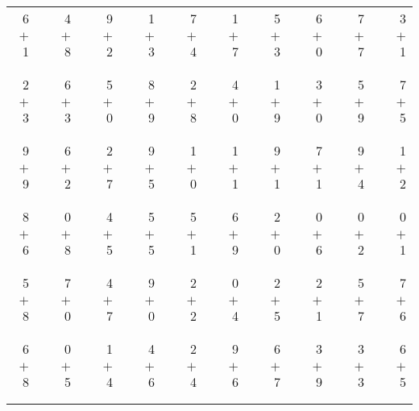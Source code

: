 \documentclass[12pt, letterpaper]{article}
\begin{document}
\begin{tabular}{rrrrrrrrrrrrrrrrrrr}
6 & & 4 & & 9 & & 1 & & 7 & & 1 & & 5 & & 6 & & 7 & & 3\\
$+$ 1 & & $+$ 8 & & $+$ 2 & & $+$ 3 & & $+$ 4 & & $+$ 7 & & $+$ 3 & & $+$ 0 & & $+$ 7 & & $+$ 1\\
\cline{1-1} \cline{3-3} \cline{5-5} \cline{7-7} \cline{9-9} \cline{11-11} \cline{13-13} \cline{15-15} \cline{17-17} \cline{19-19} \\ \\
2 & & 6 & & 5 & & 8 & & 2 & & 4 & & 1 & & 3 & & 5 & & 7\\
$+$ 3 & & $+$ 3 & & $+$ 0 & & $+$ 9 & & $+$ 8 & & $+$ 0 & & $+$ 9 & & $+$ 0 & & $+$ 9 & & $+$ 5\\
\cline{1-1} \cline{3-3} \cline{5-5} \cline{7-7} \cline{9-9} \cline{11-11} \cline{13-13} \cline{15-15} \cline{17-17} \cline{19-19} \\ \\
9 & & 6 & & 2 & & 9 & & 1 & & 1 & & 9 & & 7 & & 9 & & 1\\
$+$ 9 & & $+$ 2 & & $+$ 7 & & $+$ 5 & & $+$ 0 & & $+$ 1 & & $+$ 1 & & $+$ 1 & & $+$ 4 & & $+$ 2\\
\cline{1-1} \cline{3-3} \cline{5-5} \cline{7-7} \cline{9-9} \cline{11-11} \cline{13-13} \cline{15-15} \cline{17-17} \cline{19-19} \\ \\
8 & & 0 & & 4 & & 5 & & 5 & & 6 & & 2 & & 0 & & 0 & & 0\\
$+$ 6 & & $+$ 8 & & $+$ 5 & & $+$ 5 & & $+$ 1 & & $+$ 9 & & $+$ 0 & & $+$ 6 & & $+$ 2 & & $+$ 1\\
\cline{1-1} \cline{3-3} \cline{5-5} \cline{7-7} \cline{9-9} \cline{11-11} \cline{13-13} \cline{15-15} \cline{17-17} \cline{19-19} \\ \\
5 & & 7 & & 4 & & 9 & & 2 & & 0 & & 2 & & 2 & & 5 & & 7\\
$+$ 8 & & $+$ 0 & & $+$ 7 & & $+$ 0 & & $+$ 2 & & $+$ 4 & & $+$ 5 & & $+$ 1 & & $+$ 7 & & $+$ 6\\
\cline{1-1} \cline{3-3} \cline{5-5} \cline{7-7} \cline{9-9} \cline{11-11} \cline{13-13} \cline{15-15} \cline{17-17} \cline{19-19} \\ \\
6 & & 0 & & 1 & & 4 & & 2 & & 9 & & 6 & & 3 & & 3 & & 6\\
$+$ 8 & & $+$ 5 & & $+$ 4 & & $+$ 6 & & $+$ 4 & & $+$ 6 & & $+$ 7 & & $+$ 9 & & $+$ 3 & & $+$ 5\\
\cline{1-1} \cline{3-3} \cline{5-5} \cline{7-7} \cline{9-9} \cline{11-11} \cline{13-13} \cline{15-15} \cline{17-17} \cline{19-19} \\ \\

\end{tabular}
\end{document}
